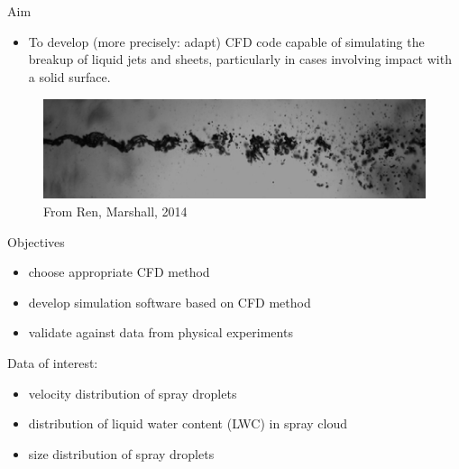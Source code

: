 \section{\thesec}
\label{sec:aim_and_objectives}

\begin{frame}{\thesec}{}
  \vspace{-2\baselineskip}
  \begin{block}{Aim}
    \begin{itemize}
      \item{
        To develop (more precisely: adapt) CFD code capable of simulating the breakup of liquid jets and sheets, particularly in cases involving impact with a solid surface.
      }
    \end{itemize}
  \end{block}
  \begin{figure}
    \centering
    \includegraphics[width=\textwidth]{img/flappingSheetBreakup12300.png}
    \caption{From Ren, Marshall, 2014 {\color{white}\cite{Ren14}}}
  \end{figure}
\end{frame}

\begin{frame}{\thesec}{}
  \vspace*{-2\baselineskip}
  \begin{block}{Objectives}
    \begin{itemize}
      \item{ choose appropriate CFD method }
      \item{ develop simulation software based on CFD method }
      \item{ validate against data from physical experiments }
    \end{itemize}
  \end{block}
  \begin{block}{Data of interest:}
    \begin{itemize}
      \item{ velocity distribution of spray droplets }
      \item{ distribution of liquid water content (LWC) in spray cloud }
      \item{ size distribution of spray droplets }
    \end{itemize}
  \end{block}
\end{frame}

